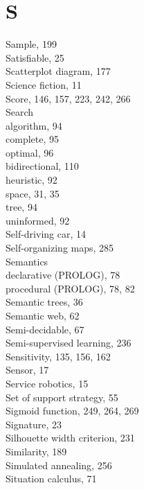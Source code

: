 \documentclass[10pt]{book}
\begin{document}
\section*{S}
Sample, 199\\
Satisfiable, 25\\
Scatterplot diagram, 177\\
Science fiction, 11\\
Score, 146, 157, 223, 242, 266\\
Search\\
algorithm, 94\\
complete, 95\\
optimal, 96\\
bidirectional, 110\\
heuristic, 92\\
space, 31, 35\\
tree, 94\\
uninformed, 92\\
Self-driving car, 14\\
Self-organizing maps, 285\\
Semantics\\
declarative (PROLOG), 78\\
procedural (PROLOG), 78, 82\\
Semantic trees, 36\\
Semantic web, 62\\
Semi-decidable, 67\\
Semi-supervised learning, 236\\
Sensitivity, 135, 156, 162\\
Sensor, 17\\
Service robotics, 15\\
Set of support strategy, 55\\
Sigmoid function, 249, 264, 269\\
Signature, 23\\
Silhouette width criterion, 231\\
Similarity, 189\\
Simulated annealing, 256\\
Situation calculus, 71
\end{document}

